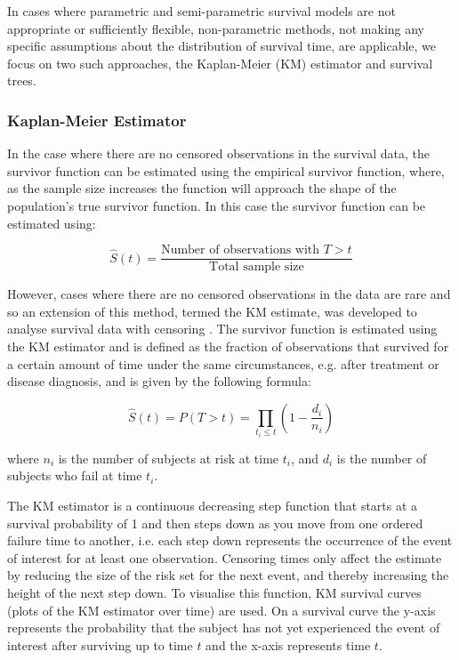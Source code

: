 In cases where parametric and semi-parametric survival models are not appropriate or sufficiently flexible, non-parametric methods, not making any specific assumptions about the distribution of survival time, are applicable, we focus on two such approaches, the Kaplan-Meier (KM) estimator and survival trees.

\subsubsection{Kaplan-Meier Estimator}
In the case where there are no censored observations in the survival data, the survivor function can be estimated using the empirical survivor function, where, as the sample size increases the function will approach the shape of the population’s true survivor function. In this case the survivor function can be estimated using: 

\begin{equation}
\hat{S}(t) = \frac{\text{Number of observations with } T > t}{\text{Total sample size}}
\end{equation}

However, cases where there are no censored observations in the data are rare and so an extension of this method, termed the KM estimate, was developed to analyse survival data with censoring \citep{kaplan58}. The survivor function is estimated using the KM estimator and is defined as the fraction of observations that survived for a certain amount of time under the same circumstances, e.g. after treatment or disease diagnosis, and is given by the following formula: 

\begin{equation}
\hat{S}(t) = P(T > t) = \prod_{t_i \leq t} (1-\frac{d_i}{n_i})
\end{equation}

where $n_i$ is the number of subjects at risk at time $t_i$, and $d_i$ is the number of subjects who fail at time $t_i$.

The KM estimator is a continuous decreasing step function that starts at a survival probability of 1 and then steps down as you move from one ordered failure time to another, i.e.  each step down represents the occurrence of the event of interest for at least one observation. Censoring times only affect the estimate by reducing the size of the risk set for the next event, and thereby increasing the height of the next step down. To visualise this function, KM survival curves (plots of the KM estimator over time) are used. On a survival curve the y-axis represents the probability that the subject has not yet experienced the event of interest after surviving up to time $t$ and the x-axis represents time $t$. 

